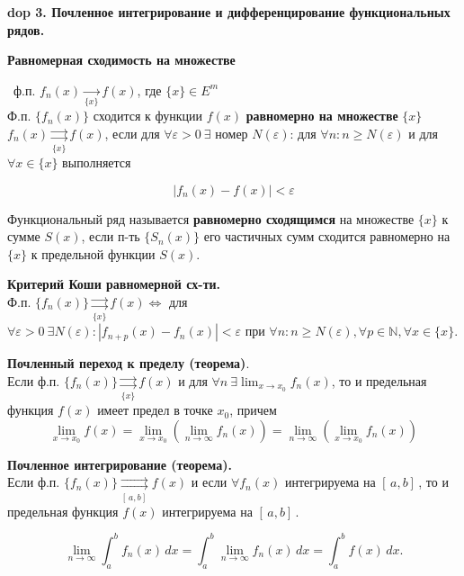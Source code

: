 \setcounter{section}{4}
\setcounter{subsection}{3}
\setcounter{equation}{0}
\textbf{\LARGE dop 3. Почленное интегрирование и дифференцирование функциональных рядов.}

\textbf{Равномерная сходимость на множестве}

\mathLet \ ф.п. $f_n(x) \xrightarrow[\{x\}]{}  f(x)$, где $\{x\} \in E^m$ \\
Ф.п. $\{f_n(x)\}$ сходится к функции $f(x)$ \textbf{равномерно на множестве} $\{x\}$ \ $f_n(x)\underset{\{x\}}{\rightrightarrows}f(x)$, если для $\forall \varepsilon > 0 \ \exists$ номер $N(\varepsilon)$: для $\forall n: n \ge N(\varepsilon)$ и для $\forall x \in \{x\}$ выполняется

\begin{equation}
    |f_n(x) - f(x)| < \varepsilon
\end{equation}

\bigbreak
Функциональный ряд называется \textbf{равномерно сходящимся} на множестве $\{x\}$ к сумме $S(x)$, если п-ть $\{S_n(x)\}$ его частичных сумм сходится равномерно на $\{x\}$ к предельной функции $S(x)$.

\bigbreak
\textbf{Критерий Коши равномерной сх-ти.} \\
Ф.п. $\{f_n(x)\}\underset{\{x\}}{\rightrightarrows}f(x) \Leftrightarrow $ для $\forall \varepsilon > 0 \ \exists N(\varepsilon): |f_{n+p}(x) - f_n(x)| < \varepsilon \text{ при } \forall n: n \ge N(\varepsilon), \forall p \in \mathbb{N}, \forall x \in \{x\}$.

\bigbreak
\textbf{Почленный переход к пределу (теорема)}. \\
Если ф.п. $\{f_n(x)\} \underset{\{x\}}{\rightrightarrows}f(x)$ и для $\forall n \ \exists \lim_{x \rightarrow x_0}{f_n(x)} $, то и предельная функция $f(x)$ имеет предел в точке $x_0$, причем
\begin{equation}
    \lim_{x \rightarrow x_0}{f(x)} = \lim_{x \rightarrow x_0}{(\lim_{n \rightarrow \infty}{f_n(x)})} = \lim_{n \rightarrow \infty}{(\lim_{x \rightarrow x_0}{f_n(x)})}
\end{equation}

\bigbreak
\textbf{Почленное интегрирование (теорема).} \\
Если ф.п. $\{f_n(x)\} \underset{[\,a,b]\, }{\rightrightarrows}f(x)$ и если $\forall f_n(x)$ интегрируема на $[\,a,b]\,$, то и предельная функция $f(x)$ интегрируема на $[\,a,b]\,$.

\begin{equation}
    \lim_{n \rightarrow \infty}{\int_{a}^{b} f_n(x) \,dx} =  \int_{a}^{b} \lim_{n \rightarrow \infty}{f_n(x)} \,dx = \int_{a}^{b} f(x) \,dx.
\end{equation}


